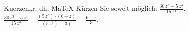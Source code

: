 \begin{MAufgabe}{Kuerzen}{kr, dh, MaTeX}
K\"urzen Sie soweit m\"oglich: $\frac{30\, z^3 - 5\, z^4}{15\, z^3}$.\\ 
\ifLsg\MLoesung
\quad $\frac{30\, z^3 - 5\, z^4}{15\, z^3}=\frac{(5\, z^3)\cdot(6 - z)}{(5\, z^3)\cdot(3)}=\frac{6 - z}{3}$.\else\relax\fi
 \end{MAufgabe}